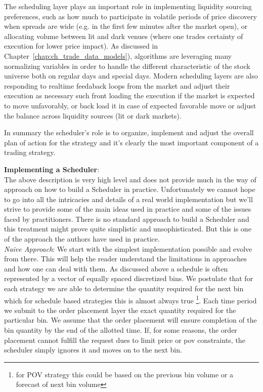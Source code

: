 The scheduling layer plays an important role in  implementing liquidity sourcing preferences, such as how much to participate in volatile periods of price discovery when spreads are wide (e.g. in the first few minutes after the market open), or allocating volume between lit and dark venues (where one trades certainty of execution for lower price impact). As discussed in Chapter~\ref{chap:ch_trade_data_models}), algorithms are leveraging many normalizing  variables in order to handle the different characteristic of the stock universe both on regular days and special days.  Modern scheduling layers are also responding to realtime feedaback loops from the market and adjust their execution as necessary such front loading the execution if the market is expected to move unfavorably, or back load it in case of expected favorable move or adjust the balance across liquidity sources (lit or dark markets). 

In summary the scheduler's role is to organize, implement  and adjust the overall plan of action for the strategy and it's clearly the most important component of a trading strategy.

\noindent\textbf{Implementing a Scheduler}: \\

The above description is very high level and does not provide much in the way of approach on how to build a Scheduler in practice. Unfortunately we cannot hope to go into all the intricacies and details of a real world implementation but we'll strive to provide some of the main ideas used in practice and some of the issues faced by practitioners. There is no standard approach to build a Scheduler and this treatment might prove quite simplistic and unsophisticated. But this is one of the approach the authors have used in practice.\\

\noindent\emph{Naive Approach}: 
We start with the simplest implementation possible and evolve from there. This will help the reader understand the limitations in approaches and how one can deal with them.
As discussed above a schedule is often represented by a vector of equally spaced discretized bins. We postulate that for each strategy we are able to determine the quantity required for the next bin which for schedule based strategies this is almost always true \footnote{for POV strategy this could be based on the previous bin volume or a forecast of next bin volume}. Each time period we submit to the order placement layer the exact quantity required for the particular bin. We assume that the order placement will ensure completion of the bin quantity by the end of the allotted time. If, for some reasons, the order placement cannot fulfill the request dues to limit price or pov constraints, the scheduler simply ignores it and moves on to the next bin. 

